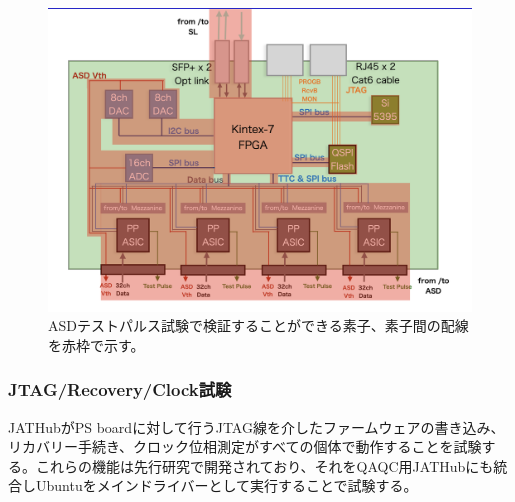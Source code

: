 \begin{figure} 
\centering
\includegraphics[width=16cm]{fig/QAQCasdtpelements.png}
\caption[ASDテストパルス試験で検証できる素子]{ASDテストパルス試験で検証することができる素子、素子間の配線を赤枠で示す。}
\label{QAQCasdtpelements}
\end{figure}

\subsubsection{JTAG/Recovery/Clock試験}
\label{subsubsec_jtag}
JATHubがPS boardに対して行うJTAG線を介したファームウェアの書き込み、リカバリー手続き、クロック位相測定がすべての個体で動作することを試験する。これらの機能は先行研究で開発されており、それをQAQC用JATHubにも統合しUbuntuをメインドライバーとして実行することで試験する。

